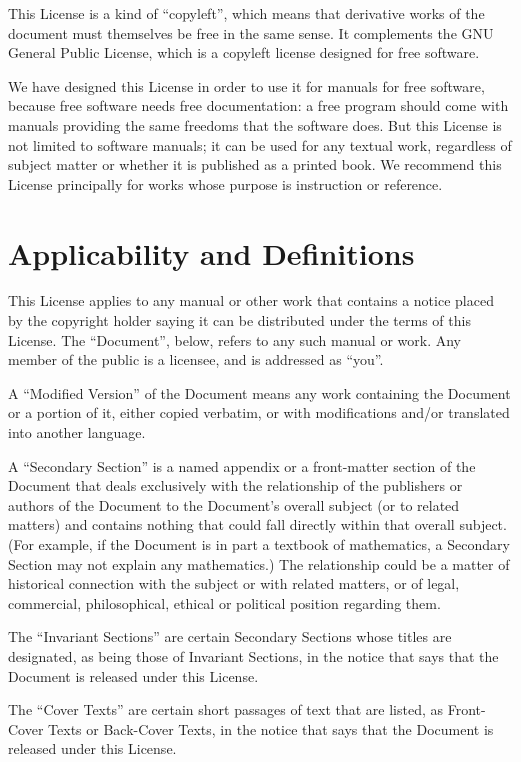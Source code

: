 \documentclass[oneside,a4paper]{book}
\begin{document}
This License is a kind of ``copyleft'', which means that derivative
works of the document must themselves be free in the same sense.  It
complements the GNU General Public License, which is a copyleft
license designed for free software.

We have designed this License in order to use it for manuals for free
software, because free software needs free documentation: a free
program should come with manuals providing the same freedoms that the
software does.  But this License is not limited to software manuals;
it can be used for any textual work, regardless of subject matter or
whether it is published as a printed book.  We recommend this License
principally for works whose purpose is instruction or reference.

\section{Applicability and Definitions}

This License applies to any manual or other work that contains a
notice placed by the copyright holder saying it can be distributed
under the terms of this License.  The ``Document'', below, refers to any
such manual or work.  Any member of the public is a licensee, and is
addressed as ``you''.

A ``Modified Version'' of the Document means any work containing the
Document or a portion of it, either copied verbatim, or with
modifications and/or translated into another language.

A ``Secondary Section'' is a named appendix or a front-matter section of
the Document that deals exclusively with the relationship of the
publishers or authors of the Document to the Document's overall subject
(or to related matters) and contains nothing that could fall directly
within that overall subject.  (For example, if the Document is in part a
textbook of mathematics, a Secondary Section may not explain any
mathematics.)  The relationship could be a matter of historical
connection with the subject or with related matters, or of legal,
commercial, philosophical, ethical or political position regarding
them.

The ``Invariant Sections'' are certain Secondary Sections whose titles
are designated, as being those of Invariant Sections, in the notice
that says that the Document is released under this License.

The ``Cover Texts'' are certain short passages of text that are listed,
as Front-Cover Texts or Back-Cover Texts, in the notice that says that
the Document is released under this License.
\end{document}
